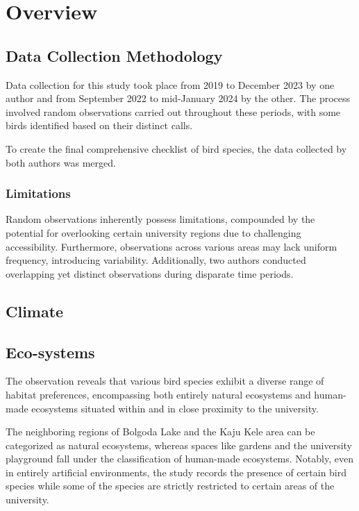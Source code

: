 \chapter{Overview}
\label{cp:overview}
\section{Data Collection Methodology}
Data collection for this study took place from 2019 to December 2023 by one author and from September 2022 to mid-January 2024 by the other. The process involved random observations carried out throughout these periods, with some birds identified based on their distinct calls.

To create the final comprehensive checklist of bird species, the data collected by both authors was merged.

\begin{importantbox}
\subsection{Limitations}
 Random observations inherently possess limitations, compounded by the potential for overlooking certain university regions due to challenging accessibility. Furthermore, observations across various areas may lack uniform frequency, introducing variability. Additionally, two authors conducted overlapping yet distinct observations during disparate time periods.
\end{importantbox}

\section{Climate}


\section{Eco-systems}
The observation reveals that various bird species exhibit a diverse range of habitat preferences, encompassing both entirely natural ecosystems and human-made ecosystems situated within and in close proximity to the university.

The neighboring regions of Bolgoda Lake and the Kaju Kele area can be categorized as natural ecosystems, whereas spaces like gardens and the university playground fall under the classification of human-made ecosystems. Notably, even in entirely artificial environments, the study records the presence of certain bird species while some of the species are strictly restricted to certain areas of the university.
